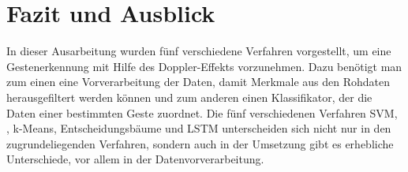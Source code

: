 \section{Fazit und Ausblick} 

In dieser Ausarbeitung wurden fünf verschiedene Verfahren vorgestellt, um eine
Gestenerkennung mit Hilfe des Doppler-Effekts vorzunehmen. Dazu benötigt man zum
einen eine Vorverarbeitung der Daten, damit Merkmale aus den Rohdaten
herausgefiltert werden können und zum anderen einen Klassifikator, der die Daten
einer bestimmten Geste zuordnet. Die fünf verschiedenen Verfahren \ac{SVM},
, k-Means, Entscheidungsbäume und \ac{LSTM} unterscheiden sich nicht
nur in den zugrundeliegenden Verfahren, sondern auch in der Umsetzung gibt es
erhebliche Unterschiede, vor allem in der Datenvorverarbeitung.

